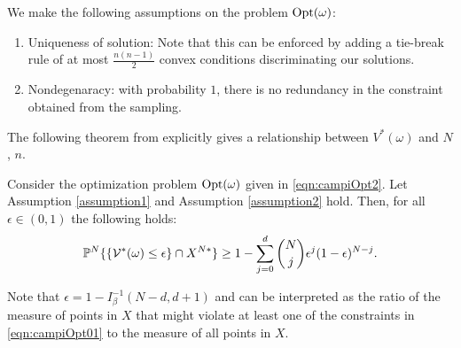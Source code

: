 We make the following assumptions on the problem $\text{Opt}(\omega)$:
\begin{enumerate}
\item \label{assumption1} Uniqueness of solution: Note that this can be enforced by adding a tie-break rule of at most $\frac{n(n-1)}{2}$ convex conditions discriminating our solutions. 
\item \label{assumption2} Nondegenaracy: with probability $1$, there is no redundancy in the constraint obtained from the sampling. 
\end{enumerate}

The following theorem from \cite{campi} explicitly gives a relationship between $V^*(\omega)$ and $N$, $n$.
\begin{theorem}\label{thm:campi}Consider the optimization problem $\text{Opt}(\omega)$ given in \eqref{eqn:campiOpt2}. Let Assumption \ref{assumption1} and Assumption \ref{assumption2} hold. Then, for all $\epsilon \in (0,1)$ the following holds:
\begin{equation*}\mathbb{P}^N\{\{\mathcal{V}^*(\omega) \leq \epsilon\} \cap X^{N*}\} \geq 1- \sum_{j=0}^{d} \binom{N}{j}\epsilon^j (1-\epsilon)^{N-j}.\end{equation*}
\end{theorem}

Note that $\epsilon=1-I_{\beta}^{-1}(N-d, d+1)$ and can be interpreted as the ratio of the measure of points in $X$ that might violate at least one of the constraints in \eqref{eqn:campiOpt01} to the measure of all points in $X$.

